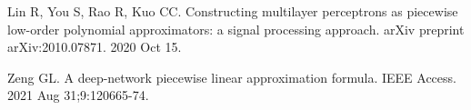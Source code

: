 \begin{latin}
	\begin{thebibliography}{9}
		Lin R, You S, Rao R, Kuo CC. Constructing multilayer perceptrons as piecewise low-order polynomial approximators: a signal processing approach. arXiv preprint arXiv:2010.07871. 2020 Oct 15.
		
		Zeng GL. A deep-network piecewise linear approximation formula. IEEE Access. 2021 Aug 31;9:120665-74.
	\end{thebibliography} 
\end{latin}










%
%	
%		
%		
%		
%		
%		
%		
%		
